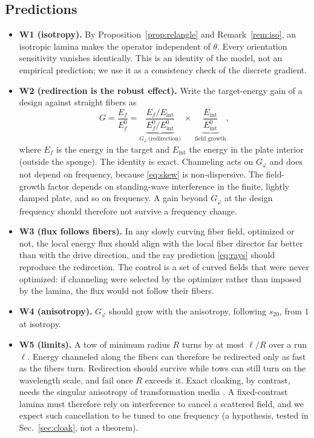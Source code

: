 \subsection{Predictions}\label{sec:predictions}
\begin{itemize}[itemsep=2pt]
\item \textbf{W1 (isotropy).} By Proposition~\ref{prop:relangle} and
Remark~\ref{rem:iso}, an isotropic lamina makes the operator independent of $\theta$.
Every orientation sensitivity vanishes identically. This is an identity of the model,
not an empirical prediction; we use it as a consistency check of the discrete gradient.
\item \textbf{W2 (redirection is the robust effect).} Write the target-energy gain of a
design against straight fibers as
\begin{equation}
G=\frac{E_f}{E_f^0}=\underbrace{\frac{E_f/E_{\mathrm{int}}}{E_f^0/E^0_{\mathrm{int}}}}_{G_\varphi\ \text{(redirection)}}
\;\times\;\underbrace{\frac{E_{\mathrm{int}}}{E^0_{\mathrm{int}}}}_{\text{field growth}},
\label{eq:gainsplit}
\end{equation}
where $E_f$ is the energy in the target and $E_{\mathrm{int}}$ the energy in the plate
interior (outside the sponge). The identity is exact. Channeling acts on
$G_\varphi$ and does not depend on frequency, because \eqref{eq:skew} is
non-dispersive. The field-growth factor depends on standing-wave interference in the
finite, lightly damped plate, and so on frequency. A gain beyond $G_\varphi$ at the
design frequency should therefore not survive a frequency change.
\item \textbf{W3 (flux follows fibers).} In any slowly curving fiber field, optimized or
not, the local energy flux should align with the local fiber director far better than
with the drive direction, and the ray prediction \eqref{eq:rays} should reproduce the redirection. The control is a set of curved fields that were never
optimized: if channeling were selected by the optimizer rather than imposed by the
lamina, the flux would not follow their fibers.
\item \textbf{W4 (anisotropy).} $G_\varphi$ should grow with the anisotropy, following
$s_{20}$, from $1$ at isotropy.
\item \textbf{W5 (limits).} A tow of minimum radius $R$ turns by at most $\ell/R$ over a run
$\ell$. Energy channeled along the fibers can therefore be redirected only as fast as
the fibers turn. Redirection should survive while tows can still turn on the
wavelength scale, and fail once $R$ exceeds it. Exact cloaking, by contrast,
needs the singular anisotropy of transformation media \cite{norris2008}. A
fixed-contrast lamina must therefore rely on interference to cancel a scattered field, and
we expect such cancellation to be tuned to one frequency (a hypothesis, tested in
Sec.~\ref{sec:cloak}, not a theorem).
\end{itemize}
